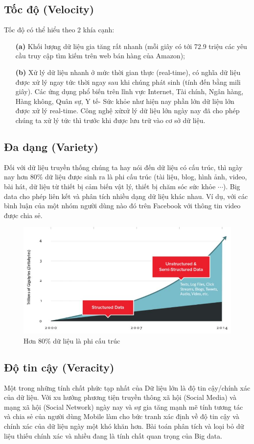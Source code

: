 \documentclass[12pt,a4paper]{report}
\begin{document}
	\subsection{Tốc độ (Velocity)}
	Tốc độ có thể hiểu theo 2 khía cạnh:
	\begin{itemize}
		\item[\textbf{(a)}] Khối lượng dữ liệu gia tăng rất nhanh (mỗi giây có tới 72.9 triệu các yêu cầu truy cập tìm kiếm trên web bán hàng của Amazon); \item[\textbf{(b)}] Xử lý dữ liệu nhanh ở mức thời gian thực (real-time), có nghĩa dữ liệu được xử lý ngay tức thời ngay sau khi chúng phát sinh (tính đến bằng mili giây). Các ứng dụng phổ biến trên lĩnh vực Internet, Tài chính, Ngân hàng, Hàng không, Quân sự, Y tế- Sức khỏe như hiện nay phần lớn dữ liệu lớn được xử lý real-time. Công nghệ xửxử lý dữ liệu lớn ngày nay đã cho phép chúng ta xử lý tức thì trước khi được lưu trữ vào cơ sở dữ liệu.
		
	\end{itemize} \subsection{Đa dạng (Variety)}
	Đối với dữ liệu truyền thống chúng ta hay nói đến dữ liệu có cấu 
	trúc, thì ngày nay hơn 80\% dữ liệu được sinh ra là phi cấu trúc (tài liệu, blog, hình ảnh, video, bài hát, dữ liệu từ thiết bị cảm biến vật lý, thiết bị chăm sóc sức khỏe $\cdots$). Big data cho phép liên kết và phân tích nhiều dạng dữ liệu khác nhau. Ví dụ, với các bình luận của một nhóm người dùng nào đó trên Facebook với thông tin video được chia sẻ.
	\begin{figure}[h]
		\centering
		\includegraphics[scale=.6]{b-2.jpg}
		\caption{Hơn 80\% dữ liệu là phi cấu trúc}
	\end{figure}
	\subsection{Độ tin cậy (Veracity)}
	Một trong những tính chất phức tạp nhất của Dữ liệu lớn là độ tin cậy/chính xác của dữ liệu. Với xu hướng phương tiện truyền thông xã hội (Social Media) và mạng xã hội (Social Network) ngày nay và sự gia tăng mạnh mẽ tính tương tác và chia sẻ của người dùng Mobile làm cho bức tranh xác định về độ tin cậy và chính xác của dữ liệu ngày một khó khăn hơn. Bài toán phân tích và loại bỏ dữ liệu thiếu chính xác và nhiều đang là tính chất quan trọng của Big data.
\end{document}

